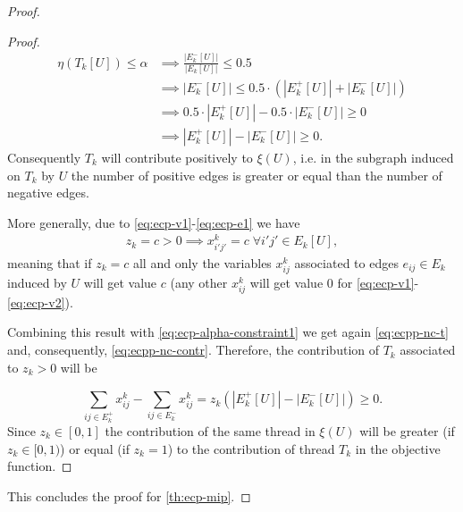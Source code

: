 \begin{proof}
\begin{proof}
		\begin{align}
			\eta(T_k[U]) \leq \alpha & \implies \frac{|E^{-}_{k}[U]|}{|E_{k}[U]|}
			\leq 0.5                                                                                            \\
			                         & \implies |E^{-}_{k}[U]| \leq 0.5 \cdot (|E^{+}_{k}[U]| + |E^{-}_{k}[U]|) \\
			                         & \implies 0.5 \cdot |E^{+}_{k}[U]| - 0.5 \cdot |E^{-}_{k}[U]| \geq 0      \\
			\label{eq:ecpp-nc-contr}
			                         & \implies |E^{+}_{k}[U]| - |E^{-}_{k}[U]|
			\geq 0.
		\end{align}
		Consequently $T_k$ will contribute positively to $\xi(U)$, i.e.
		in the subgraph induced on $T_k$ by $U$
		the number of positive edges is greater or equal than the
		number of negative edges.

		More generally, due to \eqref{eq:ecp-v1}-\eqref{eq:ecp-e1} we have
		\begin{gather*}
			z_k = c > 0 \implies x_{i'j'}^{k} = c \; \forall i'j'
			\in E_k[U],
		\end{gather*}
		meaning that if $z_k = c$ all and only the variables $x_{ij}^{k}$
		associated to edges $e_{ij} \in E_k$ induced by $U$
		will get value $c$ (any other $x_{ij}^{k}$ will get value $0$ for
		\eqref{eq:ecp-v1}-\eqref{eq:ecp-v2}).

		Combining this result with \eqref{eq:ecp-alpha-constraint1} we get
		again \eqref{eq:ecpp-nc-t} and, consequently, \eqref{eq:ecpp-nc-contr}.
		Therefore, the contribution of $T_k$ associated to $z_k > 0$ will be

		\begin{equation}
			\sum^{}_{ij \in E^{+}_k } x_{ij}
				^{k} - \sum_{ij \in E^{-}_k } x_{ij} ^{k} = z_k (|E^{+}_{k}[U]| -
			|E^{-}_{k}[U]|) \geq 0.
		\end{equation}
		Since $z_k \in [0, 1]$ the contribution of the same thread in $\xi(U)$
		will be greater (if $z_k \in [0, 1)$) or equal (if $z_k = 1$) to the
		contribution of thread $T_k$ in the objective function.

	\end{proof}

	This concludes the proof for \autoref{th:ecp-mip}.
\end{proof}

